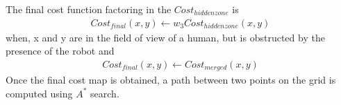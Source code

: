 The final cost function factoring in the $Cost_{hidden zone}$ is
\begin{align}
Cost_{final}(x,y) \leftarrow w_{3} Cost_{hidden zone}(x,y)
\end{align}
when, x and y are in the field of view of a human, but is obstructed by the presence of the robot and 
\begin{align}
Cost_{final}(x,y) \leftarrow Cost_{merged}(x,y)
\end{align}
Once the final cost map is obtained, a path between two points on the grid is computed using $A^*$ search. 

